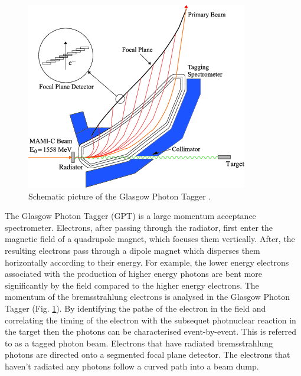 \begin{figure}[H]
\begin{center}
\includegraphics[scale=0.8]{pictures/png/GlaTagger.png}
\caption{Schematic picture of the Glasgow Photon Tagger \cite{marcu}.}
\label{gpt}
\end{center}
\end{figure}

\indent The Glasgow Photon Tagger (GPT) is a large momentum acceptance spectrometer. Electrons, after passing through the radiator, first enter the magnetic field of a quadrupole magnet, which focuses them vertically. After, the resulting electrons pass through a dipole magnet which disperses them horizontally according to their energy. For example, the lower energy electrons associated with the production of higher energy photons are bent more significantly by the field compared to the higher energy electrons. The momentum of the bremsstrahlung electrons is analysed in the Glasgow Photon Tagger (Fig. \ref{gpt}). By identifying the pathe of the electron in the field and correlating the timing of the electron with the subsequet photnuclear reaction in the target then the photons can be characterised event-by-event. This is referred to as a tagged photon beam. Electrons that have radiated bremsstrahlung photons are directed onto a segmented focal plane detector. The electrons that haven't radiated any photons follow a curved path into a beam dump.

